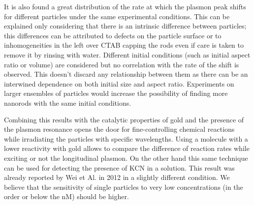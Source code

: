 \documentclass{article}
\begin{document}
It is also found a great distribution of the rate at which the plasmon peak
shifts for different particles under the same experimental conditions. This can
be explained only considering that there is an intrinsic difference between
particles; this differences can be attributed to defects on the particle surface
or to inhomogeneities in the left over CTAB capping the rods even if care is
taken to remove it by rinsing with water. Different initial conditions (such as
initial aspect ratio or volume) are considered but no correlation with the rate
of the shift is observed. This doesn't discard any relationship between them as
there can be an interwined dependence on both initial size and aspect ratio.
Experiments on larger ensembles of particles would increase the possibility of
finding more nanorods with the same initial conditions. 

Combining this results with the catalytic properties of gold and the presence of
the plasmon resonance opens the door for fine-controlling chemical reactions
while irradiating the particles with specific wavelengths. Using a molecule with
a lower reactivity with gold allows to compare the difference of reaction rates
while exciting or not the longitudinal plasmon. On the other hand this same
technique can be used for detecting the presence of KCN in a solution. This
result was already reported by Wei et Al. in 2012 \cite{Wei2012} in a slightly
different condition. We believe that the sensitivity of single particles to very
low concentrations (in the order or below the nM) should be higher. 

{}

\end{document}
